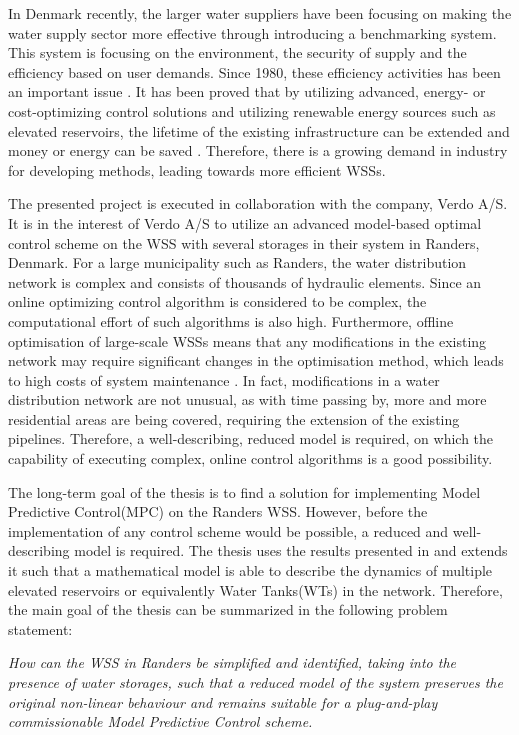In Denmark recently, the larger water suppliers have been focusing on making the water supply sector more effective through introducing a benchmarking system. This system is focusing on the environment, the security of supply and the efficiency based on user demands. Since 1980, these efficiency activities has been an important issue \cite{water_denmark}. It has been proved that by utilizing advanced, energy- or cost-optimizing control solutions and utilizing renewable energy sources such as elevated reservoirs, the lifetime of the existing infrastructure can be extended and money or energy can be saved \cite{sustainable_water}. Therefore, there is a growing demand in industry for developing methods, leading towards more efficient WSSs. 

The presented project is executed in collaboration with the company, Verdo A/S. It is in the interest of Verdo A/S to utilize an advanced model-based optimal control scheme on the WSS with several storages in their system in Randers, Denmark. For a large municipality such as Randers, the water distribution network is complex and consists of thousands of hydraulic elements. Since an online optimizing control algorithm is considered to be complex, the computational effort of such algorithms is also high. Furthermore, offline optimisation of large-scale WSSs means that any modifications in the existing network may require significant changes in the optimisation method, which leads to high costs of system maintenance \cite{brdys1994operational}. In fact, modifications in a water distribution network are not unusual, as with time passing by, more and more residential areas are being covered, requiring the extension of the existing pipelines. Therefore, a well-describing, reduced model is required, on which the capability of executing complex, online control algorithms is a good possibility. 

The long-term goal of the thesis is to find a solution for implementing Model Predictive Control(MPC) on the Randers WSS. However, before the implementation of any control scheme would be possible, a reduced and well-describing model is required. The thesis uses the results presented in \cite{oneinput_paper} and extends it such that a mathematical model is able to describe the dynamics of multiple elevated reservoirs or equivalently Water Tanks(WTs) in the network.  Therefore, the main goal of the thesis can be summarized in the following problem statement:

\emph{How can the WSS in Randers be simplified and identified, taking into the presence of water storages, such that a reduced model of the system preserves the original non-linear behaviour and remains suitable for a plug-and-play commissionable Model Predictive Control scheme.}









